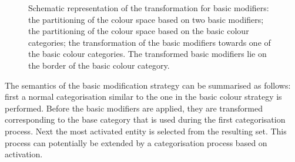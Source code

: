 \begin{figure}
\centering
{}
\caption[Schematic representation of the transformation for basic
modifiers]{Schematic representation of the transformation for
  basic modifiers:  the
  partitioning of the colour space based on two basic modifiers;
   the partitioning of the
  colour space based on the basic colour categories;
   the transformation
  of the basic modifiers towards one of the basic colour
  categories. The transformed basic modifiers lie on the border
 of the basic colour category.}
\label{f:ams-semantics-schematic}
\end{figure}

The semantics of the basic modification strategy can be
summarised as follows: first a normal categorisation similar to the
one in the basic colour strategy is performed. Before the
basic modifiers are applied, they are transformed corresponding
to the base category that is used during the first categorisation
process. Next the most activated entity is selected from the resulting
set. This process can potentially be extended by a categorisation
process based on activation.

